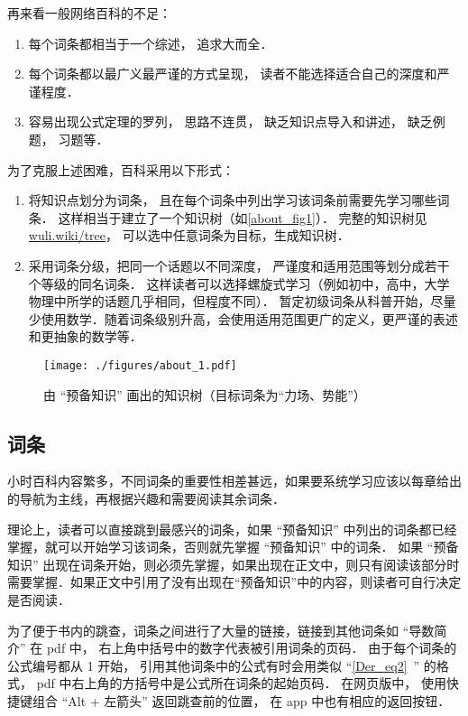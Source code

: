 再来看一般网络百科的不足：
\begin{enumerate}
\item 每个词条都相当于一个综述， 追求大而全．
\item 每个词条都以最广义最严谨的方式呈现， 读者不能选择适合自己的深度和严谨程度．
\item 容易出现公式定理的罗列， 思路不连贯， 缺乏知识点导入和讲述， 缺乏例题， 习题等．
\end{enumerate}

为了克服上述困难，百科采用以下形式：
\begin{enumerate}
\item 将知识点划分为词条， 且在每个词条中列出学习该词条前需要先学习哪些词条． 这样相当于建立了一个知识树（如\autoref{about_fig1}）． 完整的知识树见 \href{https://wuli.wiki/tree}{wuli.wiki/tree}， 可以选中任意词条为目标，生成知识树．
\item 采用词条分级，把同一个话题以不同深度， 严谨度和适用范围等划分成若干个等级的同名词条． 这样读者可以选择螺旋式学习（例如初中，高中，大学物理中所学的话题几乎相同，但程度不同）． 暂定初级词条从科普开始，尽量少使用数学．随着词条级别升高，会使用适用范围更广的定义，更严谨的表述和更抽象的数学等．
\end{enumerate}

\begin{figure}[ht]
\centering
\texttt{[image: ./figures/about\_1.pdf]}
\caption{由 “预备知识” 画出的知识树（目标词条为“力场、势能”）}\label{about_fig1}
\end{figure}

\subsection{词条}
小时百科内容繁多，不同词条的重要性相差甚远，如果要系统学习应该以每章给出的导航为主线，再根据兴趣和需要阅读其余词条．

理论上，读者可以直接跳到最感兴的词条，如果 “预备知识” 中列出的词条都已经掌握，就可以开始学习该词条，否则就先掌握 “预备知识” 中的词条． 如果 “预备知识” 出现在词条开始，则必须先掌握，如果出现在正文中，则只有阅读该部分时需要掌握．如果正文中引用了没有出现在“预备知识”中的内容，则读者可自行决定是否阅读．

为了便于书内的跳查，词条之间进行了大量的链接，链接到其他词条如 “导数简介” 在 pdf 中， 右上角中括号中的数字代表被引用词条的页码． 由于每个词条的公式编号都从 1 开始， 引用其他词条中的公式有时会用类似 “\autoref{Der_eq2}~” 的格式， pdf 中右上角的方括号中是公式所在词条的起始页码． 在网页版中， 使用快捷键组合 “Alt + 左箭头” 返回跳查前的位置， 在 app 中也有相应的返回按钮．

